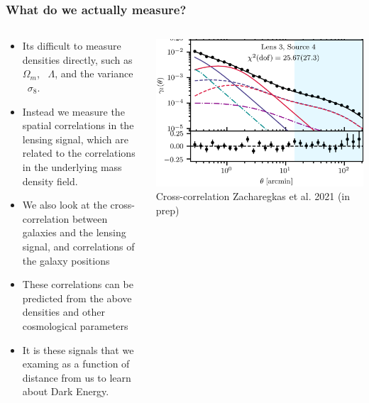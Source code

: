 \documentclass{beamer}
\newcommand{\glambda}{\mbox{{\color{brightred} $\Lambda$}}}
\newcommand{\gsigma}{\mbox{{\color{gold} $\sigma_8$}}}
\newcommand{\gomegam}{\mbox{{\color{gold} $\Omega_m$}}}
\begin{document}
\frame
{
    \frametitle{What do we actually measure?}


    \begin{columns}
        \begin{column}{0.5\textwidth}    
            \begin{itemize}

                \item Its difficult to measure densities directly, such
                    as \gomegam, \glambda, and the variance \gsigma.

                \item Instead we measure the spatial correlations in
                    the lensing signal, which are related to the correlations
                    in the underlying mass density field.


                \item We also look at the cross-correlation between
                    galaxies and the lensing signal, and correlations
                    of the galaxy positions

                \item These correlations can be predicted from the above densities and other
                    cosmological parameters
                    
                \item It is these signals that we examing as a function
                    of distance from us to learn about Dark Energy.

            \end{itemize}
        \end{column}
        \begin{column}{0.5\textwidth}
            \begin{center}
                \includegraphics[width=\textwidth]{ggl-example.png}
                Cross-correlation Zacharegkas et al. 2021 (in prep)
            \end{center}
        \end{column}
    \end{columns}
}
\end{document}
